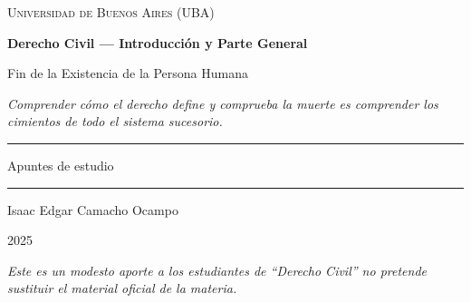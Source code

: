 \documentclass[12pt,oneside]{book}
\newcommand{\universidad}{Universidad de Buenos Aires (UBA)}
\newcommand{\materia}{Derecho Civil --- Introducción y Parte General}
\newcommand{\titulo}{Fin de la Existencia de la Persona Humana}
\newcommand{\autor}{Isaac Edgar Camacho Ocampo}
\newcommand{\anio}{2025}
\begin{document}
\begin{titlepage}

\thispagestyle{empty}

\begin{center}

\vspace*{1cm}

{\large \textsc{\universidad}}

\vspace{3cm}

{\Huge \textbf{\materia}}

\vspace{1cm}

{\LARGE \titulo}

\vspace{0.8cm}

\textit{Comprender cómo el derecho define y comprueba la muerte es comprender los cimientos de todo el sistema sucesorio.}

\vspace{1.2cm}

\rule{0.70\textwidth}{0.5pt}

\vspace{0.5cm}

{\large Apuntes de estudio}

\vspace{0.5cm}

\rule{0.70\textwidth}{0.5pt}

\vfill

{\large \autor}

\vspace{0.3cm}

{\large \anio}

\end{center}

\vfill

\begin{flushleft}
\textit{Este es un modesto aporte a los estudiantes de ``Derecho Civil'' no pretende sustituir el material oficial de la materia.}
\end{flushleft}

\end{titlepage}

\tableofcontents
\end{document}

